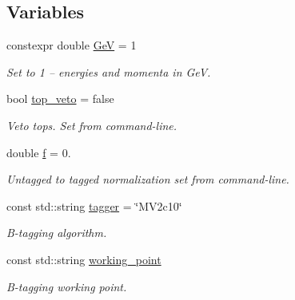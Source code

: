 \subsection*{Variables}
\begin{DoxyCompactItemize}
\item 
\mbox{\label{resolved-recon_8cpp_ac892a3dd45d520f1251d884ed2ece241}} 
constexpr double \mbox{\hyperlink{resolved-recon_8cpp_ac892a3dd45d520f1251d884ed2ece241}{GeV}} = 1
\begin{DoxyCompactList}\small\item\em Set to 1 -- energies and momenta in GeV. \end{DoxyCompactList}\item 
\mbox{\label{resolved-recon_8cpp_a9d909ff87daf03f929307723ae2dc091}} 
bool \mbox{\hyperlink{resolved-recon_8cpp_a9d909ff87daf03f929307723ae2dc091}{top\+\_\+veto}} = false
\begin{DoxyCompactList}\small\item\em Veto tops. Set from command-\/line. \end{DoxyCompactList}\item 
\mbox{\label{resolved-recon_8cpp_a2e13cbaaba1951fdfe9e83d8b031e802}} 
double \mbox{\hyperlink{resolved-recon_8cpp_a2e13cbaaba1951fdfe9e83d8b031e802}{f}} = 0.
\begin{DoxyCompactList}\small\item\em Untagged to tagged normalization set from command-\/line. \end{DoxyCompactList}\item 
\mbox{\label{resolved-recon_8cpp_a5f20320a7d7b4c60138459eeccd2bcb5}} 
const std\+::string \mbox{\hyperlink{resolved-recon_8cpp_a5f20320a7d7b4c60138459eeccd2bcb5}{tagger}} = \char`\"{}M\+V2c10\char`\"{}
\begin{DoxyCompactList}\small\item\em B-\/tagging algorithm. \end{DoxyCompactList}\item 
const std\+::string \mbox{\hyperlink{resolved-recon_8cpp_a9dcf535f9c480ed812fa8f897b47a357}{working\+\_\+point}}
\begin{DoxyCompactList}\small\item\em B-\/tagging working point. \end{DoxyCompactList}\end{DoxyCompactItemize}


